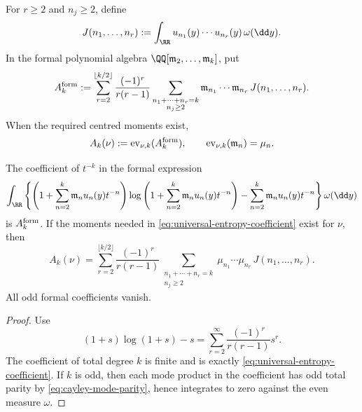 For \(r\ge2\) and \(n_j\ge2\), define
\begin{equation}\label{eq:mode-integral-definition}
J(n_1,\ldots,n_r):=
\int_{\RR}u_{n_1}(y)\cdots u_{n_r}(y)\,\omega(\dd y).
\end{equation}
In the formal polynomial algebra
\(\QQ[\mathfrak m_2,\ldots,\mathfrak m_k]\), put
\begin{equation}\label{eq:universal-entropy-coefficient}
A_k^{\rm form}:=
\sum_{r=2}^{\lfloor k/2\rfloor}
\frac{(-1)^r}{r(r-1)}
\sum_{\substack{n_1+\cdots+n_r=k\\ n_j\ge2}}
\mathfrak m_{n_1}\cdots\mathfrak m_{n_r}\,J(n_1,\ldots,n_r).
\end{equation}
When the required centred moments exist,
\begin{equation}\label{eq:universal-entropy-coefficient-evaluation}
A_k(\nu):=\operatorname{ev}_{\nu,k}(A_k^{\rm form}),
\qquad
\operatorname{ev}_{\nu,k}(\mathfrak m_n)=\mu_n .
\end{equation}

\begin{theorem}%
\label{thm:universal-entropy-coefficients}
The coefficient of \(t^{-k}\) in the formal expression
\[
\int_{\RR}\left\{
\left(1+\sum_{n=2}^{k}\mathfrak m_nu_n(y)t^{-n}\right)
\log\left(1+\sum_{n=2}^{k}\mathfrak m_nu_n(y)t^{-n}\right)
-\sum_{n=2}^{k}\mathfrak m_nu_n(y)t^{-n}
\right\}\omega(\dd y)
\]
is \(A_k^{\rm form}\).  If the moments needed in
\eqref{eq:universal-entropy-coefficient} exist for \(\nu\), then
\[
A_k(\nu)=
\sum_{r=2}^{\lfloor k/2\rfloor}
\frac{(-1)^r}{r(r-1)}
\sum_{\substack{n_1+\cdots+n_r=k\\ n_j\ge2}}
\mu_{n_1}\cdots\mu_{n_r}\,J(n_1,\ldots,n_r).
\]
All odd formal coefficients vanish.
\end{theorem}

\begin{proof}
Use
\[
(1+s)\log(1+s)-s=\sum_{r=2}^{\infty}\frac{(-1)^r}{r(r-1)}s^r.
\]
The coefficient of total degree \(k\) is finite and is exactly
\eqref{eq:universal-entropy-coefficient}.  If \(k\) is odd, then each mode
product in the coefficient has odd total parity by
\eqref{eq:cayley-mode-parity}, hence integrates to zero against the even
measure \(\omega\).
\end{proof}

